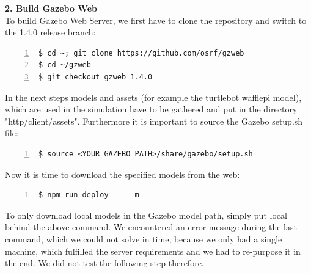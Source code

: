 \documentclass[plainarticle,zihtitle,english,final,hyperref,utf8]{zihpub}
\begin{document}
\textbf{2. Build Gazebo Web}\\
\newline
To build Gazebo Web Server, we first have to clone the repository and switch to the 1.4.0 release branch:\\
\begin{Verbatim}[breaklines=true, breakanywhere=true, baselinestretch=1,fontsize=\scriptsize,numbers=left,frame=single,stepnumber=5,xleftmargin=1cm,xrightmargin=1cm]
$ cd ~; git clone https://github.com/osrf/gzweb
$ cd ~/gzweb
$ git checkout gzweb_1.4.0

\end{Verbatim}
\newline
In the next steps models and assets (for example the turtlebot wafflepi model), which are used in the simulation have to be gathered and put in the directory "http/client/assets". Furthermore it is important to source the Gazebo setup.sh file:\\
\begin{Verbatim}[breaklines=true, breakanywhere=true, baselinestretch=1,fontsize=\scriptsize,numbers=left,frame=single,stepnumber=5,xleftmargin=1cm,xrightmargin=1cm]
$ source <YOUR_GAZEBO_PATH>/share/gazebo/setup.sh

\end{Verbatim}
\newline
Now it is time to download the specified models from the web:\\
\begin{Verbatim}[breaklines=true, breakanywhere=true, baselinestretch=1,fontsize=\scriptsize,numbers=left,frame=single,stepnumber=5,xleftmargin=1cm,xrightmargin=1cm]
$ npm run deploy --- -m

\end{Verbatim}
To only download local models in the Gazebo model path, simply put local behind the above command. We encountered an error message during the last command, which we could not solve in time, because we only had a single machine, which fulfilled the server requirements and we had to re-purpose it in the end. We did not test the following step therefore.
\newline
\end{document}
